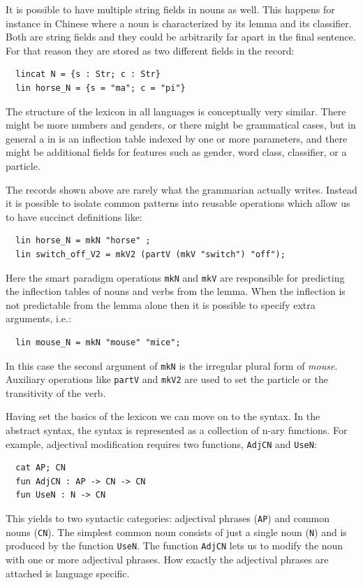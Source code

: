 \documentclass[output=paper]{langsci/langscibook}
\begin{document}
It is possible to have multiple string fields in nouns as well. This happens for instance in Chinese where a noun is characterized by its lemma and its classifier. Both are string fields and they could be arbitrarily far apart in the final sentence. For that reason they are stored as two different fields in the record:
\begin{verbatim}
  lincat N = {s : Str; c : Str}
  lin horse_N = {s = "ma"; c = "pi"}
\end{verbatim}

The structure of the lexicon in all languages is 
conceptually very similar. There might be more numbers and genders, 
or there might be grammatical cases, but in general a  in 
 is an inflection table indexed by one or more parameters, and 
there might be additional fields for features such as gender, 
word class, classifier, or a particle. 

The records shown above are rarely what 
the  grammarian actually writes. Instead it is possible to 
isolate common patterns into reusable operations which allow us to 
have succinct definitions like:
\begin{verbatim}
  lin horse_N = mkN "horse" ;
  lin switch_off_V2 = mkV2 (partV (mkV "switch") "off");
\end{verbatim}
Here the smart paradigm \citep{dblp:conf/eacl/detrezr12} operations 
\verb=mkN= and \verb=mkV= are responsible for predicting 
the inflection tables of nouns and verbs from the lemma. 
When the inflection is not predictable from the lemma alone then 
it is possible to specify extra arguments, i.e.:\largerpage
\begin{verbatim}
  lin mouse_N = mkN "mouse" "mice";
\end{verbatim}
In this case the second argument of \verb=mkN= is 
the irregular plural form of \textit{mouse}. Auxiliary operations 
like \verb=partV= and \verb=mkV2= are used to set the particle or 
the transitivity of the verb.

Having set the basics of the lexicon we can move on to the syntax. 
In the abstract syntax, the syntax is represented as a collection of 
n-ary functions. For example, adjectival modification requires two 
functions, \verb=AdjCN= and \verb=UseN=:
\begin{verbatim}
  cat AP; CN
  fun AdjCN : AP -> CN -> CN
  fun UseN : N -> CN
\end{verbatim}
This yields to two syntactic categories: adjectival phrases (\verb=AP=) and 
common nouns (\verb=CN=). The simplest common noun consists of just 
a single noun (\verb=N=) and is produced by the function \verb=UseN=. 
The function \verb=AdjCN= lets us to modify the noun with one or 
more adjectival phrases. How exactly the adjectival phrases are
attached is language specific.
\end{document}
